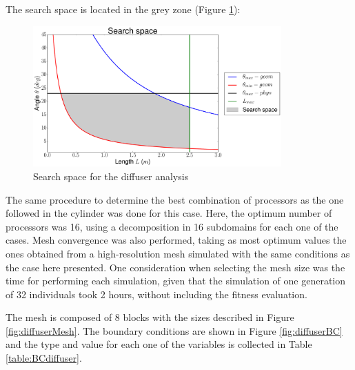 The search space is located in the grey zone (Figure \ref{fig:searchSpace}):

     \begin{figure}[h!]
        \centering
        \includegraphics[width=0.85\textwidth]{Figures/3/SearchSpace.pdf}
        \caption{Search space for the diffuser analysis}
        \label{fig:searchSpace}
    \end{figure}

\newpage

The same procedure to determine the best combination of processors as the one followed in the cylinder was done for this case. Here, the optimum number of processors was 16, using a decomposition in 16 subdomains for each one of the cases. Mesh convergence was also performed, taking as most optimum values the ones obtained from a high-resolution mesh simulated with the same conditions as the case here presented. One consideration when selecting the mesh size was the time for performing each simulation, given that the simulation of one generation of 32 individuals took 2 hours, without including the fitness evaluation. 

The mesh is composed of 8 blocks with the sizes described in Figure \ref{fig:diffuserMesh}. The boundary conditions are shown in Figure \ref{fig:diffuserBC} and the type and value for each one of the variables is collected in Table \ref{table:BCdiffuser}. 

    \vspace{10mm}    
    

